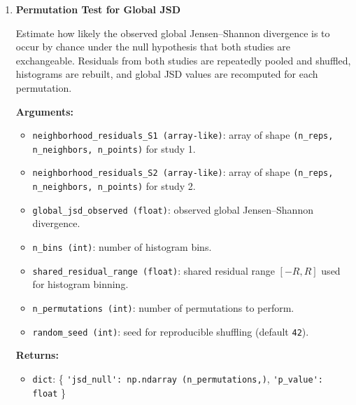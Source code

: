 \begin{enumerate}
        \textbf{Returns:}
        \begin{itemize}
            \item \lstinline!dict!: \{
                \lstinline!'global_js_divergence': float!,  
                \lstinline!'weights': np.ndarray (n_points,)!
            \}
        \end{itemize}

        \begin{lstlisting}[language=Python, caption={Weighted Global JSD}]
out = tox_compute_weighted_global_divergence(
    js_divergences,
    included_S1,
    included_S2
)

global_jsd = out["global_js_divergence"]
weights = out["weights"]
        \end{lstlisting}

    \item \textbf{Permutation Test for Global JSD}

        Estimate how likely the observed global Jensen–Shannon divergence is to occur by chance under the null hypothesis that both studies are exchangeable.  
        Residuals from both studies are repeatedly pooled and shuffled, histograms are rebuilt, and global JSD values are recomputed for each permutation.

        \textbf{Arguments:}
        \begin{itemize}
            \item \lstinline!neighborhood_residuals_S1 (array-like)!: array of shape \lstinline!(n_reps, n_neighbors, n_points)! for study 1.
            \item \lstinline!neighborhood_residuals_S2 (array-like)!: array of shape \lstinline!(n_reps, n_neighbors, n_points)! for study 2.
            \item \lstinline!global_jsd_observed (float)!: observed global Jensen–Shannon divergence.
            \item \lstinline!n_bins (int)!: number of histogram bins.
            \item \lstinline!shared_residual_range (float)!: shared residual range \([-R, R]\) used for histogram binning.
            \item \lstinline!n_permutations (int)!: number of permutations to perform.
            \item \lstinline!random_seed (int)!: seed for reproducible shuffling (default \lstinline!42!).
        \end{itemize}

        \textbf{Returns:}
        \begin{itemize}
            \item \lstinline!dict!: \{
                \lstinline!'jsd_null': np.ndarray (n_permutations,)!,  
                \lstinline!'p_value': float!
            \}
        \end{itemize}


\end{enumerate}
